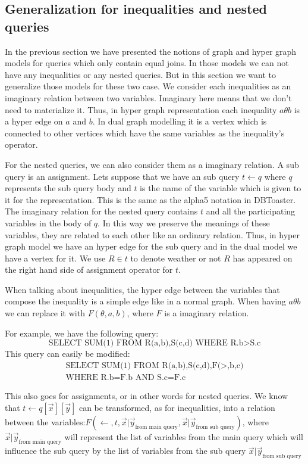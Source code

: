 \documentclass[12pt]{article}
\begin{document}
\subsection{Generalization for inequalities and nested queries}
\label{sec:generalization}
In the previous section we have presented the notions of graph and hyper graph models for queries which only contain equal joins. In those models we can not have any inequalities or any nested queries. But in this section we want to generalize those models for these two case. We consider each inequalities as an imaginary relation between two variables. Imaginary here means that we don't need to materialize it. Thus, in hyper graph representation each inequality $a\theta b$ is a hyper edge on $a$ and $b$. In dual graph modelling it is a vertex which is connected to other vertices which have the same variables as the inequality's operator.\par
For the nested queries, we can also consider them as a imaginary relation. A sub query is an assignment. Lets suppose that we have an sub query $t\gets q$ where $q$ represents the sub query body and $t$ is the name of the variable which is given to it for the representation. This is the same as the alpha5 notation in DBToaster\cite{1}. The imaginary relation for the nested query contains $t$ and all the participating variables in the body of $q$. In this way we preserve the meanings of these variables, they are related to each other like an ordinary relation. Thus, in hyper graph model we have an hyper edge for the sub query and in the dual model we have a vertex for it. We use $R\in t$ to denote weather or not $R$ has appeared on the right hand side of assignment operator for $t$. \\\par
When talking about inequalities, the hyper edge between the variables that compose the inequality is a simple edge like in a normal graph. When having $a\theta b$ we can replace it with $F(\theta,a,b)$, where $F$ is a imaginary relation. 

For example, we have the following query:
$$\mbox{SELECT SUM(1) FROM R(a,b),S(c,d) WHERE R.b$>$S.c}$$
This query can easily be modified:
\begin{align*}
\mbox{SELECT SUM(1) FROM R(a,b),S(c,d),F($>$,b,c)}\\\mbox{WHERE R.b=F.b AND S.c=F.c}
\end{align*}

This also goes for assignments, or in other words for nested queries. We know that $t\gets q[\vec{x}][\vec{y}]$ can be transformed, as for inequalities, into a relation between the variables:$F(\gets,t,{\vec{x}|\vec{y}}_{\mbox{from main query}},{\vec{x}|\vec{y}}_{\mbox{from sub query}})$, where ${\vec{x}|\vec{y}}_{\mbox{from main query}}$ will represent the list of variables from the main query which will influence the sub query by the list of variables from the sub query $ {\vec{x}|\vec{y}}_{\mbox{from sub query}}$
\end{document}
